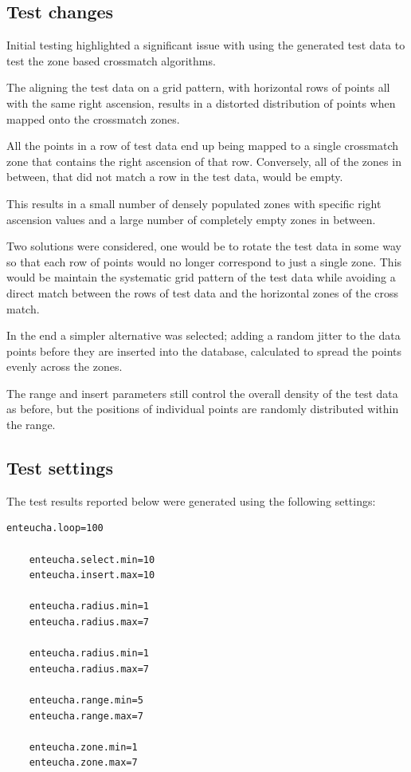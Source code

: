 \documentclass{article}
\newcommand{\crossmatch} {crossmatch\xspace}
\begin{document}
\subsection{Test changes}
\label{test-changes}

Initial testing highlighted a significant issue with using the generated test data to test the zone based \crossmatch algorithms.

The aligning the test data on a grid pattern, with horizontal rows of points all with the same right ascension, results in a distorted distribution of points when mapped onto the \crossmatch zones.

All the points in a row of test data end up being mapped to a single \crossmatch zone that contains the right ascension of that row. Conversely, all of the zones in between, that did not match a row in the test data, would be empty.

This results in a small number of densely populated zones with specific right ascension values and a large number of completely empty zones in between.

Two solutions were considered, one would be to rotate the test data in some way so that each row of points would no longer correspond to just a single zone. This would be maintain the systematic grid pattern of the test data while avoiding a direct match between the rows of test data and the horizontal zones of the cross match.

In the end a simpler alternative was selected; adding a random jitter to the data points before they are inserted into the database, calculated to spread the points evenly across the zones.

The range and insert parameters still control the overall density of the test data as before, but the positions of individual points are randomly distributed within the range.

\subsection{Test settings}
\label{test-settings}

The test results reported below were generated using the following settings:
\begin{lstlisting}[]
    enteucha.loop=100

    enteucha.select.min=10
    enteucha.insert.max=10

    enteucha.radius.min=1
    enteucha.radius.max=7

    enteucha.radius.min=1
    enteucha.radius.max=7

    enteucha.range.min=5
    enteucha.range.max=7

    enteucha.zone.min=1
    enteucha.zone.max=7
\end{lstlisting}
\end{document}
